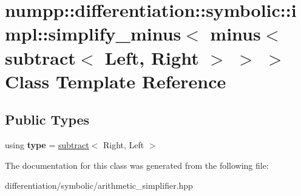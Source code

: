 \hypertarget{classnumpp_1_1differentiation_1_1symbolic_1_1impl_1_1simplify__minus_3_01minus_3_01subtract_3_01Left_00_01Right_01_4_01_4_01_4}{}\section{numpp\+:\+:differentiation\+:\+:symbolic\+:\+:impl\+:\+:simplify\+\_\+minus$<$ minus$<$ subtract$<$ Left, Right $>$ $>$ $>$ Class Template Reference}
\label{classnumpp_1_1differentiation_1_1symbolic_1_1impl_1_1simplify__minus_3_01minus_3_01subtract_3_01Left_00_01Right_01_4_01_4_01_4}
\subsection*{Public Types}
\begin{DoxyCompactItemize}
\item 
\mbox{\label{classnumpp_1_1differentiation_1_1symbolic_1_1impl_1_1simplify__minus_3_01minus_3_01subtract_3_01Left_00_01Right_01_4_01_4_01_4_a0fa3ad8e490035c76020bf98682ac87d}} 
using {\bfseries type} = \hyperlink{classnumpp_1_1differentiation_1_1symbolic_1_1subtract}{subtract}$<$ Right, Left $>$
\end{DoxyCompactItemize}


The documentation for this class was generated from the following file\+:\begin{DoxyCompactItemize}
\item 
differentiation/symbolic/arithmetic\+\_\+simplifier.\+hpp\end{DoxyCompactItemize}
